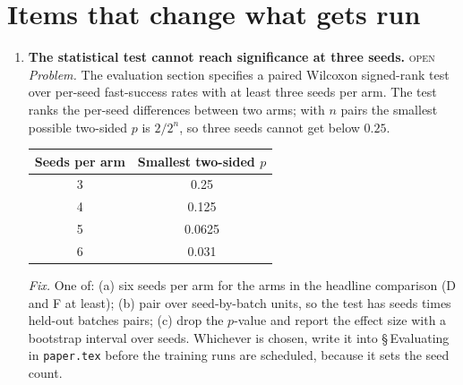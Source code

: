 \documentclass[11pt,a4paper]{article}
\newcommand{\status}[1]{\hfill{\small\textsc{#1}}}
\begin{document}
\section{Items that change what gets run}
\label{sec:run}

\begin{enumerate}[leftmargin=1.8em, itemsep=0.8em]

\item \textbf{The statistical test cannot reach significance at three
seeds.} \status{open}
\label{it:wilcoxon}
\\
\emph{Problem.} The evaluation section specifies a paired Wilcoxon
signed-rank test over per-seed fast-success rates with at least three
seeds per arm. The test ranks the per-seed differences between two arms;
with $n$ pairs the smallest possible two-sided $p$ is $2/2^{n}$, so three
seeds cannot get below $0.25$.
\begin{center}
\small
\begin{tabular}{@{}cc@{}}
\toprule
Seeds per arm & Smallest two-sided $p$ \\
\midrule
3 & 0.25 \\
4 & 0.125 \\
5 & 0.0625 \\
6 & 0.031 \\
\bottomrule
\end{tabular}
\end{center}
\emph{Fix.} One of: (a) six seeds per arm for the arms in the headline
comparison (D and F at least); (b) pair over seed-by-batch units, so the
test has seeds times held-out batches pairs; (c) drop the $p$-value and
report the effect size with a bootstrap interval over seeds. Whichever is
chosen, write it into \S\,Evaluating in \texttt{paper.tex} before the
training runs are scheduled, because it sets the seed count.


\end{enumerate}
\end{document}
